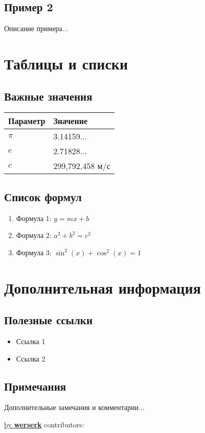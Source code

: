 \documentclass[10pt,landscape,a4paper]{article}
\begin{document}
\begin{multicols}{2}
\subsection{Пример 2}
Описание примера...

\section{Таблицы и списки}

\subsection{Важные значения}
\begin{center}
\begin{tabular}{@{}ll@{}}
\toprule
Параметр & Значение \\
\midrule
$\pi$ & 3.14159... \\
$e$ & 2.71828... \\
$c$ & 299,792,458 м/с \\
\bottomrule
\end{tabular}
\end{center}

\subsection{Список формул}
\begin{enumerate}
    \item Формула 1: $y = mx + b$
    \item Формула 2: $a^2 + b^2 = c^2$
    \item Формула 3: $\sin^2(x) + \cos^2(x) = 1$
\end{enumerate}

\section{Дополнительная информация}

\subsection{Полезные ссылки}
\begin{itemize}
    \item Ссылка 1
    \item Ссылка 2
\end{itemize}

\subsection{Примечания}
Дополнительные замечания и комментарии...

\end{multicols}

{\noindent \href{https://werserk.com}{\textcolor{accent}{by \textbf{werserk}}} \hfill contributors: \contributorsDisplay}
\end{document}
